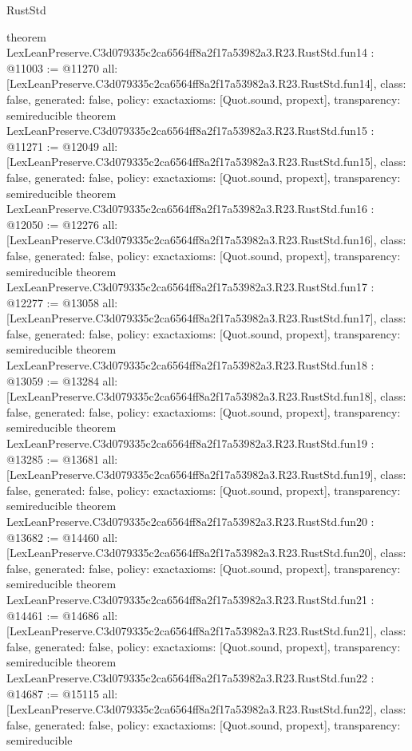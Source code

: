 \begin{lexlean}{RustStd}
\begin{coremodule}
{}
theorem LexLeanPreserve.C3d079335c2ca6564ff8a2f17a53982a3.R23.RustStd.fun14 : @11003 := @11270 {
  all: [LexLeanPreserve.C3d079335c2ca6564ff8a2f17a53982a3.R23.RustStd.fun14],
  class: false,
  generated: false,
  policy: exact{axioms: [Quot.sound, propext]},
  transparency: semireducible
}
theorem LexLeanPreserve.C3d079335c2ca6564ff8a2f17a53982a3.R23.RustStd.fun15 : @11271 := @12049 {
  all: [LexLeanPreserve.C3d079335c2ca6564ff8a2f17a53982a3.R23.RustStd.fun15],
  class: false,
  generated: false,
  policy: exact{axioms: [Quot.sound, propext]},
  transparency: semireducible
}
theorem LexLeanPreserve.C3d079335c2ca6564ff8a2f17a53982a3.R23.RustStd.fun16 : @12050 := @12276 {
  all: [LexLeanPreserve.C3d079335c2ca6564ff8a2f17a53982a3.R23.RustStd.fun16],
  class: false,
  generated: false,
  policy: exact{axioms: [Quot.sound, propext]},
  transparency: semireducible
}
theorem LexLeanPreserve.C3d079335c2ca6564ff8a2f17a53982a3.R23.RustStd.fun17 : @12277 := @13058 {
  all: [LexLeanPreserve.C3d079335c2ca6564ff8a2f17a53982a3.R23.RustStd.fun17],
  class: false,
  generated: false,
  policy: exact{axioms: [Quot.sound, propext]},
  transparency: semireducible
}
theorem LexLeanPreserve.C3d079335c2ca6564ff8a2f17a53982a3.R23.RustStd.fun18 : @13059 := @13284 {
  all: [LexLeanPreserve.C3d079335c2ca6564ff8a2f17a53982a3.R23.RustStd.fun18],
  class: false,
  generated: false,
  policy: exact{axioms: [Quot.sound, propext]},
  transparency: semireducible
}
theorem LexLeanPreserve.C3d079335c2ca6564ff8a2f17a53982a3.R23.RustStd.fun19 : @13285 := @13681 {
  all: [LexLeanPreserve.C3d079335c2ca6564ff8a2f17a53982a3.R23.RustStd.fun19],
  class: false,
  generated: false,
  policy: exact{axioms: [Quot.sound, propext]},
  transparency: semireducible
}
theorem LexLeanPreserve.C3d079335c2ca6564ff8a2f17a53982a3.R23.RustStd.fun20 : @13682 := @14460 {
  all: [LexLeanPreserve.C3d079335c2ca6564ff8a2f17a53982a3.R23.RustStd.fun20],
  class: false,
  generated: false,
  policy: exact{axioms: [Quot.sound, propext]},
  transparency: semireducible
}
theorem LexLeanPreserve.C3d079335c2ca6564ff8a2f17a53982a3.R23.RustStd.fun21 : @14461 := @14686 {
  all: [LexLeanPreserve.C3d079335c2ca6564ff8a2f17a53982a3.R23.RustStd.fun21],
  class: false,
  generated: false,
  policy: exact{axioms: [Quot.sound, propext]},
  transparency: semireducible
}
theorem LexLeanPreserve.C3d079335c2ca6564ff8a2f17a53982a3.R23.RustStd.fun22 : @14687 := @15115 {
  all: [LexLeanPreserve.C3d079335c2ca6564ff8a2f17a53982a3.R23.RustStd.fun22],
  class: false,
  generated: false,
  policy: exact{axioms: [Quot.sound, propext]},
  transparency: semireducible
}
\end{coremodule}
\end{lexlean}
